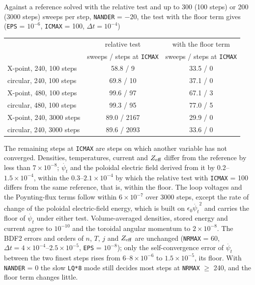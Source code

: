 \documentclass[11pt]{article}
\def\r#1{{\rm#1}}
\def\psit{\psi_t}
\def\psitd{\dot{\psit}}
\begin{document}
Against a reference solved with the relative test and up to 300 (100 steps) or
200 (3000 steps) sweeps per step, \texttt{NANDER} = $-20$, the test with the floor
term gives (\texttt{EPS} = $10^{-6}$, \texttt{ICMAX} = 100, $\Delta t = 10^{-4}$)

\begin{center}
\begin{tabular}{|l|c|c|}\hline
 & relative test & with the floor term \\
 & sweeps / steps at \texttt{ICMAX} & sweeps / steps at \texttt{ICMAX} \\\hline
X-point, 240, 100 steps       & 58.8 / 9    & 33.5 / 0 \\
circular, 240, 100 steps      & 69.8 / 10   & 37.1 / 0 \\
X-point, 480, 100 steps       & 99.6 / 97   & 67.1 / 3 \\
circular, 480, 100 steps      & 99.3 / 95   & 77.0 / 5 \\
X-point, 240, 3000 steps      & 89.0 / 2167 & 29.9 / 0 \\
circular, 240, 3000 steps     & 89.6 / 2093 & 33.6 / 0 \\\hline
\end{tabular}
\end{center}

The remaining steps at \texttt{ICMAX} are steps on which another variable has not
converged.  Densities, temperatures, current and $Z_\r{eff}$ differ from the
reference by less than $7\times10^{-8}$; $\psitd$ and the poloidal electric field derived from it by
$0.2$--$1.5\times10^{-4}$, within the $0.3$--$2.1\times10^{-4}$ by which the
relative test with \texttt{ICMAX} = 100 differs from the same reference, that is,
within the floor.  The loop voltages and the Poynting-flux terms follow within
$6\times10^{-7}$ over 3000 steps, except the rate of change of the poloidal
electric-field energy, which is built on $\epsilon_0\psitd^2$ and carries the floor
of $\psitd$ under either test.  Volume-averaged densities, stored energy and
current agree to $10^{-10}$ and the toroidal angular momentum to $2\times10^{-8}$.
The BDF2 errors and orders of $n$, $T$, $j$ and $Z_\r{eff}$ are unchanged
(\texttt{NRMAX} = 60, $\Delta t = 4\times10^{-4}$--$2.5\times10^{-5}$,
\texttt{EPS} = $10^{-8}$); only the self-convergence error of $\psitd$ between
the two finest steps rises from $6$--$8\times10^{-6}$ to $1.5\times10^{-5}$, its
floor.  With \texttt{NANDER} = 0 the slow \texttt{LQ*8} mode still decides most
steps at \texttt{NRMAX} $\ge$ 240, and the floor term changes little.
\end{document}
